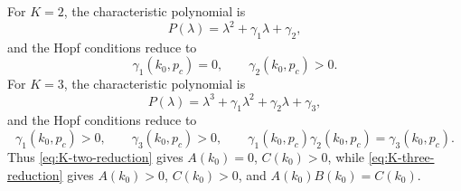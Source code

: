 For $K=2$, the characteristic polynomial is
\begin{equation}
 P(\lambda)=\lambda^2+\gamma_1\lambda+\gamma_2,
 \label{eq:K-two-polynomial}
\end{equation}
and the Hopf conditions reduce to
\begin{equation}
 \gamma_1(k_0,p_c)=0,
 \qquad
 \gamma_2(k_0,p_c)>0.
 \label{eq:K-two-reduction}
\end{equation}
For $K=3$, the characteristic polynomial is
\begin{equation}
 P(\lambda)=\lambda^3+\gamma_1\lambda^2
 +\gamma_2\lambda+\gamma_3,
 \label{eq:K-three-polynomial}
\end{equation}
and the Hopf conditions reduce to
\begin{equation}
 \gamma_1(k_0,p_c)>0,
 \qquad
 \gamma_3(k_0,p_c)>0,
 \qquad
 \gamma_1(k_0,p_c)\gamma_2(k_0,p_c)
 =\gamma_3(k_0,p_c).
 \label{eq:K-three-reduction}
\end{equation}
Thus \eqref{eq:K-two-reduction} gives $A(k_0)=0$, $C(k_0)>0$, while
\eqref{eq:K-three-reduction} gives $A(k_0)>0$, $C(k_0)>0$, and
$A(k_0)B(k_0)=C(k_0)$.
